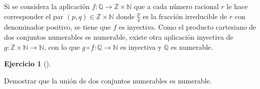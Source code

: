 \documentclass[
  a4paper,
]{scrreport}
\theoremstyle{definition}
\newtheorem{exercise}{Ejercicio}[chapter]
\theoremstyle{remark}
\begin{document}
\begin{tcolorbox}
\begin{tcolorbox}
\begin{tcolorbox}
\begin{tcolorbox}
\begin{tcolorbox}
\begin{tcolorbox}
\begin{tcolorbox}
\begin{tcolorbox}
\begin{tcolorbox}
\begin{tcolorbox}
\begin{tcolorbox}
\begin{tcolorbox}
\begin{tcolorbox}
\begin{tcolorbox}
\begin{tcolorbox}
\begin{tcolorbox}
\begin{tcolorbox}
\begin{tcolorbox}
\begin{tcolorbox}
\begin{tcolorbox}
\begin{tcolorbox}
\begin{tcolorbox}
\begin{tcolorbox}
\begin{tcolorbox}
\begin{tcolorbox}
\begin{tcolorbox}
\begin{tcolorbox}
\begin{tcolorbox}
\begin{tcolorbox}
\begin{tcolorbox}
\begin{tcolorbox}
\begin{tcolorbox}
\begin{tcolorbox}
\begin{tcolorbox}
\begin{tcolorbox}
\begin{tcolorbox}
\begin{tcolorbox}
Si se considera la aplicación
\(f:\mathbb{Q}\to \mathbb{Z}\times \mathbb{N}\) que a cada número
racional \(r\) le hace corresponder el par
\((p,q)\in \mathbb{Z}\times \mathbb{N}\) donde \(\frac{p}{q}\) es la
fracción irreducible de \(r\) con denominador positivo, se tiene que
\(f\) es inyectiva. Como el producto cartesiano de dos conjuntos
numerables es numerable, existe otra aplicación inyectiva de
\(g:\mathbb{Z}\times \mathbb{N}\to \mathbb{N}\), con lo que
\(g\circ f:\mathbb{Q}\to\mathbb{N}\) es inyectiva y \(\mathbb{Q}\) es
numerable.

\end{tcolorbox}

\begin{exercise}[]\protect\hypertarget{exr-union-numerables}{}\label{exr-union-numerables}

Demostrar que la unión de dos conjuntos numerables es numerable.

\end{exercise}


\end{tcolorbox}
\end{tcolorbox}
\end{tcolorbox}
\end{tcolorbox}
\end{tcolorbox}
\end{tcolorbox}
\end{tcolorbox}
\end{tcolorbox}
\end{tcolorbox}
\end{tcolorbox}
\end{tcolorbox}
\end{tcolorbox}
\end{tcolorbox}
\end{tcolorbox}
\end{tcolorbox}
\end{tcolorbox}
\end{tcolorbox}
\end{tcolorbox}
\end{tcolorbox}
\end{tcolorbox}
\end{tcolorbox}
\end{tcolorbox}
\end{tcolorbox}
\end{tcolorbox}
\end{tcolorbox}
\end{tcolorbox}
\end{tcolorbox}
\end{tcolorbox}
\end{tcolorbox}
\end{tcolorbox}
\end{tcolorbox}
\end{tcolorbox}
\end{tcolorbox}
\end{tcolorbox}
\end{tcolorbox}
\end{tcolorbox}
\end{document}
